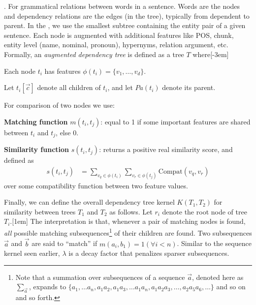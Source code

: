 \documentclass[11pt]{article}
\begin{document}
. For grammatical relations between words in a sentence. Words are the nodes and dependency relations are the edges (in the tree), typically from dependent to parent. In the , we use the smallest subtree containing the entity pair of a given sentence. Each node is augmented with additional features like POS, chunk, entity level (name, nominal, pronoun), hypernyms, relation argument, etc.  Formally, an \textit{augmented dependency tree} is defined as a tree $T$ where[-3em]
\begin{compactitem}
	\item Each node $t_i$ has features $\phi(t_i) = \{v_1, \ldots, v_d \}$. 
	
	\item Let $t_i[\vec c]$ denote all children of $t_i$, and let $Pa(t_i)$ denote its parent. 
	
	\item For comparison of two nodes we use:
	\begin{compactitem}
		\item \textbf{Matching function} $m(t_i, t_j)$: equal to 1 if some important features are shared between $t_i$ and $t_j$, else 0. 
		\item \textbf{Similarity function} $s(t_i, t_j)$: returns a positive real similarity score, and defined as
		\begin{align}
		s(t_i, t_j)
		&= \sum_{v_q \in \phi(t_i)}\sum_{v_r \in \phi(t_j)} \text{Compat}(v_q, v_r)
		\end{align}
		over some compatibility function between two feature values. 
	\end{compactitem}
\end{compactitem}
Finally, we can define the overall dependency tree kernel $K(T_1, T_2)$ for similarity between trees $T_1$ and $T_2$ as follows. Let $r_i$ denote the root node of tree $T_i$.[1em]
The interpretation is that, whenever a pair of matching nodes is found, \textit{all} possible matching subsequences\footnote{Note that a summation over subsequences of a sequence $\vec a$, denoted here as $\sum_{\vec a}$, expands to $\{a_1, \ldots a_n, a_1 a_2, a_1 a_3, \ldots a_1 a_n, a_1 a_2 a_3, \ldots, a_2 a_5 a_6, \ldots \}$ and so on and so forth.} of their children are found. Two subsequences $\vec a$ and $\vec b$ are said to ``match'' if $m(a_i, b_1) = 1 (\forall i < n)$. Similar to the sequence kernel seen earlier, $\lambda$ is a decay factor that penalizes sparser subsequences.
\end{document}

